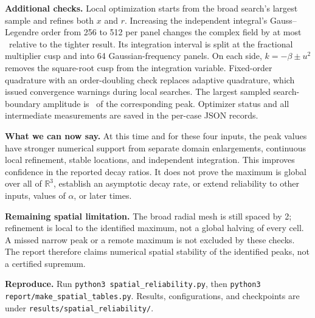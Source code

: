 \textbf{Additional checks.} Local optimization starts from the broad search's
largest sample and refines both $x$ and $r$. Increasing the independent
integral's Gauss--Legendre order from 256 to 512 per panel changes the complex field by
at most \SpatialQuadTighten\ relative to the tighter result. Its integration
interval is split at the fractional multiplier cusp and into 64 Gaussian-frequency
panels. On each side, $k=-\beta\pm u^2$ removes the square-root cusp from the
integration variable. Fixed-order quadrature with an order-doubling check replaces
adaptive quadrature, which issued convergence warnings during local searches.
The largest sampled search-boundary amplitude is \SpatialBoundary\ of
the corresponding peak. Optimizer status and all intermediate measurements are
saved in the per-case JSON records.

\textbf{What we can now say.} At this time and for these four inputs, the peak
values have stronger numerical support from separate domain enlargements,
continuous local refinement, stable locations, and independent integration.
This improves confidence in the reported decay ratios. It does not prove the
maximum is global over all of $\mathbb R^3$, establish an asymptotic decay rate,
or extend reliability to other inputs, values of $\alpha$, or later times.

\textbf{Remaining spatial limitation.} The broad radial mesh is still spaced by
2; refinement is local to the identified maximum, not a global halving of every
cell. A missed narrow peak or a remote maximum is not excluded by these checks.
The report therefore claims numerical spatial stability of the identified peaks,
not a certified supremum.

\textbf{Reproduce.} Run \texttt{python3 spatial\_reliability.py}, then
\texttt{python3 report/make\_spatial\_tables.py}. Results, configurations, and
checkpoints are under \texttt{results/spatial\_reliability/}.
